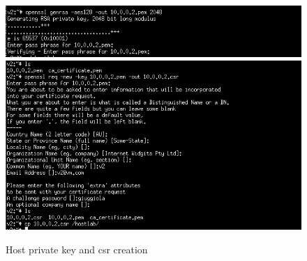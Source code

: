 \documentclass[11pt]{article}
\begin{document}
\begin{figure}[H]
	\includegraphics[width=1\textwidth]{img12-hw7-1743261.png}
	\includegraphics[width=1\textwidth]{img13-hw7-1743261.png}
	\caption{Host private key and csr creation}
\end{figure}
\end{document}

